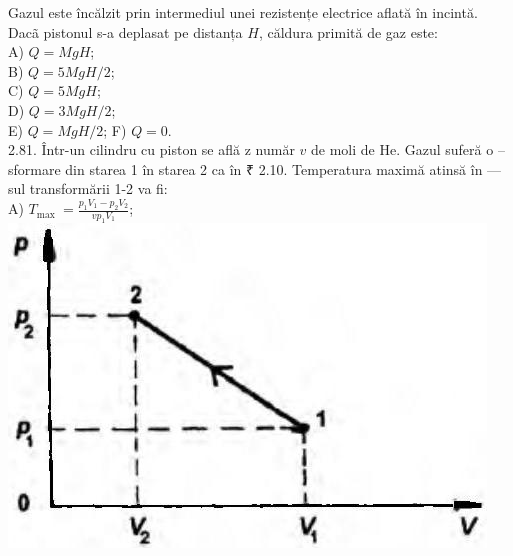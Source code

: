 \documentclass[10pt]{article}
\begin{document}
Gazul este încălzit prin intermediul unei rezistențe electrice aflată în incintă. Dacã pistonul s-a deplasat pe distanța $H$, căldura primită de gaz este:\\
A) $Q=M g H$;\\
B) $Q=5 M g H / 2$;\\
C) $Q=5 M g H$;\\
D) $Q=3 M g H / 2$;\\
E) $Q=M g H / 2$; F) $Q=0$.\\
2.81. Într-un cilindru cu piston se află z număr $v$ de moli de He. Gazul suferă o --sformare din starea 1 în starea 2 ca în ₹ 2.10. Temperatura maximă atinsă în ---sul transformării 1-2 va fi:\\
A) $T_{\text {max }}=\frac{p_{1} V_{1}-p_{2} V_{2}}{v p_{1} V_{1}}$;\\
\includegraphics[max width=\textwidth, center]{2025_07_01_5b3ff9fa0d508c8e9f17g-091}
\end{document}
